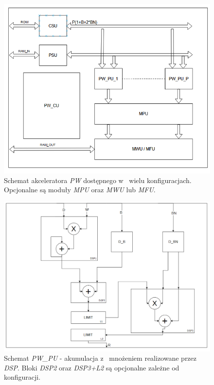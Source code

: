 \begin{figure}
    \centering
    \includegraphics[width=0.9\linewidth]{images/PWACC.png}
    \caption{Schemat akceleratora \emph{PW} dostępnego w~ wielu konfiguracjach.
    Opcjonalne są moduły \emph{MPU} oraz \emph{MWU} lub \emph{MFU}.}
    \label{fig:pwacc}
\end{figure}
\begin{figure}
    \centering
    \includegraphics[width=0.8\linewidth]{images/PW_PU.png}
    \caption{Schemat \emph{PW\_PU} - akumulacja z~ mnożeniem realizowane przez \emph{DSP}. Bloki \emph{DSP2} oraz \emph{DSP3+L2} są opcjonalne zależne od konfiguracji.}
    \label{fig:pwpu}
\end{figure}

